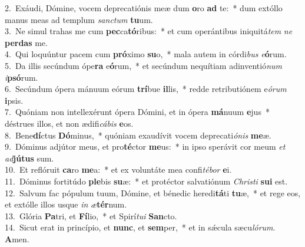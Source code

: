 {2.~}Exáudi, Dómine, vocem deprecatiónis meæ dum \textbf{o}ro \textbf{ad} te:~* dum extóllo manus meas ad templum \textit{san}\textit{ctum} \textbf{tu}um.\\
{3.~}Ne simul trahas me cum \textbf{pec}ca\textbf{tó}ribus:~* et cum operántibus iniquitá\textit{tem} \textit{ne} \textbf{per}\textbf{das} me.\\
{4.~}Qui loquúntur pacem cum \textbf{pró}ximo \textbf{su}o,~* mala autem in córdi\textit{bus} \textit{e}\textbf{ó}rum.\\
{5.~}Da illis secúndum ópe\textbf{ra} e\textbf{ó}rum,~* et secúndum nequítiam adinventió\textit{num} \textit{i}\textbf{psó}rum.\\
{6.~}Secúndum ópera mánuum eórum \textbf{trí}bue \textbf{il}lis,~* redde retributiónem e\textit{ó}\textit{rum} \textbf{i}psis.\\
{7.~}Quóniam non intellexérunt ópera Dómini, et in ópera \textbf{má}nuum \textbf{e}jus~* déstrues illos, et non ædifi\textit{cá}\textit{bis} \textbf{e}os.\\
{8.~}Bene\textbf{dí}ctus \textbf{Dó}minus,~* quóniam exaudívit vocem deprecati\textit{ó}\textit{nis} \textbf{me}æ.\\
{9.~}Dóminus adjútor meus, et pro\textbf{té}ctor \textbf{me}us:~* in ipso sperávit cor meum \textit{et} \textit{ad}\textbf{jú}\textbf{tus} sum.\\
{10.~}Et reflóruit \textbf{ca}ro \textbf{me}a:~* et ex voluntáte mea confi\textit{té}\textit{bor} \textbf{e}i.\\
{11.~}Dóminus fortitúdo \textbf{ple}bis \textbf{su}æ:~* et protéctor salvatiónum \textit{Chri}\textit{sti} \textbf{su}\textbf{i} est.\\
{12.~}Salvum fac pópulum tuum, Dómine, et bénedic heredi\textbf{tá}ti \textbf{tu}æ,~* et rege eos, et extólle illos usque \textit{in} \textit{æ}\textbf{tér}num.\\
{13.~}Glória \textbf{Pa}tri, et \textbf{Fí}lio,~* et Spirí\textit{tu}\textit{i} \textbf{San}cto.\\
{14.~}Sicut erat in princípio, et \textbf{nunc}, et \textbf{sem}per,~* et in sǽcula sæcu\textit{ló}\textit{rum}. \textbf{A}men.\\
